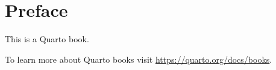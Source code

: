 \documentclass[
  letterpaper,
  DIV=11,
  numbers=noendperiod]{scrreprt}
\author{}
\date{}
\begin{document}
\chapter*{Preface}\label{preface}

This is a Quarto book.

To learn more about Quarto books visit
\url{https://quarto.org/docs/books}.
\end{document}
